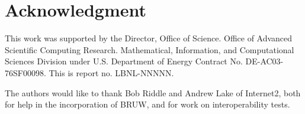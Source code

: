 \documentclass[conference]{IEEEtran}
\begin{document}
%



\section*{Acknowledgment}
This work was supported by the Director, Office of Science. Office of
Advanced Scientific Computing Research. Mathematical, Information, and
Computational Sciences Division under U.S. Department of
Energy Contract No. DE-AC03-76SF00098. This is report no. LBNL-NNNNN.

The authors would like to thank Bob Riddle and Andrew Lake of Internet2, both
for help in the incorporation of BRUW, and for work on interoperability tests.



%
%
%
\end{document}
